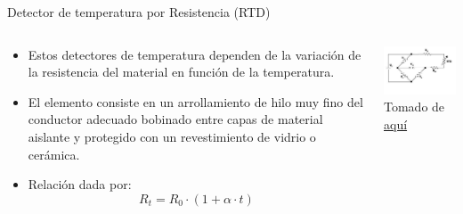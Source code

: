 \documentclass[aspectratio=169]{beamer}
\begin{document}
\begin{frame}{Detector de temperatura por Resistencia (RTD)}
    \begin{columns}[c, onlytextwidth]
        \begin{column}{0.55\textwidth}
            \begin{itemize}
                \item Estos detectores de temperatura dependen de la variación de la resistencia del material en función de la temperatura.  
                \item El elemento consiste en un arrollamiento de hilo muy fino del conductor adecuado bobinado entre capas de material aislante y protegido con un revestimiento de vidrio o cerámica. 
                \item Relación dada por: 
                \begin{equation*}
                    R_t=R_0\cdot (1+\alpha \cdot t)
                \end{equation*}
            \end{itemize}
        \end{column}
        \begin{column}{0.45\textwidth}
            \includegraphics[width=6cm]{fig/RTD_Circuit.jpg}
            \\ \tiny{Tomado de \href{https://www.azom.com/article.aspx?ArticleID=5573}{aquí}}
        \end{column}
    \end{columns}
\end{frame}
\end{document}
